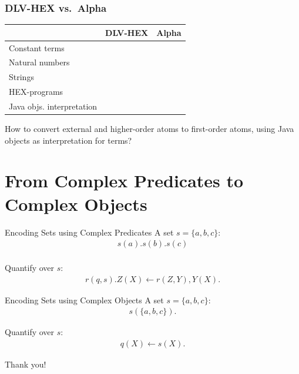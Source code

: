 \documentclass[smaller, dvipsnames]{beamer}
\newcommand{\al}{Alpha\xspace}
\begin{document}
\begin{frame}
	\frametitle{DLV-HEX vs.\ \al}
	\begin{center}
		\begin{tabular}{lcc}
			\toprule
			& DLV-HEX & \al \\
			\midrule
			Constant terms & \checkmark & \checkmark \\
			Natural numbers & \checkmark & \checkmark \\
			Strings & \checkmark & \checkmark \\
			HEX-programs & \checkmark & \\
			Java objs. interpretation & & \checkmark \\
			\bottomrule
		\end{tabular}
	\end{center}
	How to convert external and higher-order atoms to first-order atoms, using Java objects as interpretation for terms?
\end{frame}

\section{From Complex Predicates to Complex Objects}

\begin{frame}{Encoding Sets using Complex Predicates}
	A set \(s = \{ a, b, c \}\):
    \begin{align*}
    	s(a). s(b). s(c) \\
    \end{align*}

	Quantify over \(s\):
	\begin{align*}
		r(q,s).
		Z(X) \leftarrow r(Z,Y), Y(X).
	\end{align*}
\end{frame}

\begin{frame}{Encoding Sets using Complex Objects}
	A set \(s = \{ a, b, c \}\):
    \begin{align*}
    	s(\{a, b, c\}).
    \end{align*}

	Quantify over \(s\):
	\begin{align*}
		q(X) \leftarrow s(X).
	\end{align*}
\end{frame}

\begin{frame}[standout]
    Thank you!
\end{frame}
\end{document}
